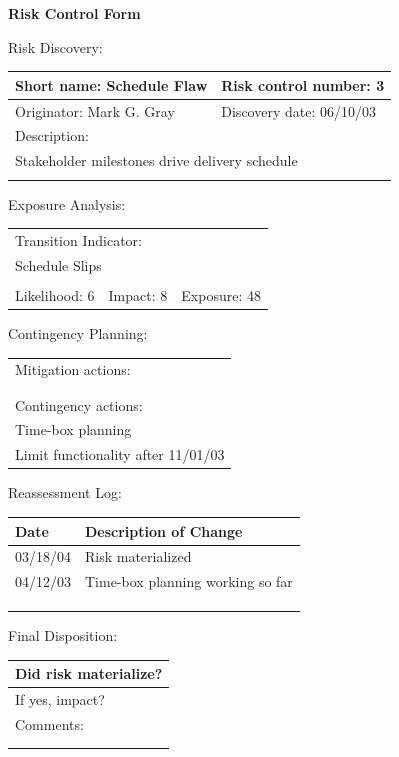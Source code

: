 \documentclass{article}
\begin{document}
\begin{center}\Large\bf
Risk Control Form
\end{center}
\vspace{24pt}

Risk Discovery:

\begin{tabular}{|p{211pt}|p{211pt}|} \hline
Short name: Schedule Flaw & Risk control number: 3\\ \hline
Originator: Mark G. Gray & Discovery date: 06/10/03 \\ \hline
\multicolumn{2}{|l|}{Description:} \\
\multicolumn{2}{|l|}{Stakeholder milestones drive delivery schedule} \\
\multicolumn{2}{|l|}{\mbox{}} \\ \hline
\end{tabular}
\vspace{24pt}

Exposure Analysis:

\begin{tabular}{|p{138pt}|p{138pt}|p{138pt}|} \hline
\multicolumn{3}{|l|}{Transition Indicator:} \\
\multicolumn{3}{|l|}{Schedule Slips} \\
\multicolumn{3}{|l|}{\mbox{}} \\ \hline
Likelihood: 6 & Impact: 8 & Exposure: 48 \\ \hline
\end{tabular}
\vspace{24pt}

Contingency Planning:

\begin{tabular}{|p{433pt}|} \hline
Mitigation actions: \\
\mbox{} \\
\mbox{} \\ \hline
Contingency actions: \\
Time-box planning \\
Limit functionality after 11/01/03 \\ \hline
\end{tabular}
\vspace{24pt}

Reassessment Log:

\begin{tabular}{|p{72pt}|p{351pt}|} \hline
Date & Description of Change \\ \hline
03/18/04 & Risk materialized \\ \hline
04/12/03 & Time-box planning working so far \\ \hline
\mbox{} & \mbox{} \\ \hline
\mbox{} & \mbox{} \\ \hline
\mbox{} & \mbox{} \\ \hline
\end{tabular}
\vspace{24pt}

Final Disposition:

\begin{tabular}{|p{433pt}|} \hline
Did risk materialize? \\ \hline
If yes, impact? \\ \hline
Comments: \\
\mbox{} \\
\mbox{} \\ \hline
\end{tabular}
\end{document}
